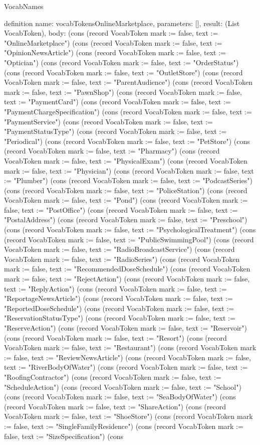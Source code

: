 \begin{lexlean}{VocabNames}
\begin{semanticmodule}
definition{
  name: vocabTokensOnlineMarketplace,
  parameters: [],
  result: (List VocabToken),
  body: (cons (record VocabToken {mark := false, text := "OnlineMarketplace"}) (cons (record VocabToken {mark := false, text := "OpinionNewsArticle"}) (cons (record VocabToken {mark := false, text := "Optician"}) (cons (record VocabToken {mark := false, text := "OrderStatus"}) (cons (record VocabToken {mark := false, text := "OutletStore"}) (cons (record VocabToken {mark := false, text := "ParentAudience"}) (cons (record VocabToken {mark := false, text := "PawnShop"}) (cons (record VocabToken {mark := false, text := "PaymentCard"}) (cons (record VocabToken {mark := false, text := "PaymentChargeSpecification"}) (cons (record VocabToken {mark := false, text := "PaymentService"}) (cons (record VocabToken {mark := false, text := "PaymentStatusType"}) (cons (record VocabToken {mark := false, text := "Periodical"}) (cons (record VocabToken {mark := false, text := "PetStore"}) (cons (record VocabToken {mark := false, text := "Pharmacy"}) (cons (record VocabToken {mark := false, text := "PhysicalExam"}) (cons (record VocabToken {mark := false, text := "Physician"}) (cons (record VocabToken {mark := false, text := "Plumber"}) (cons (record VocabToken {mark := false, text := "PodcastSeries"}) (cons (record VocabToken {mark := false, text := "PoliceStation"}) (cons (record VocabToken {mark := false, text := "Pond"}) (cons (record VocabToken {mark := false, text := "PostOffice"}) (cons (record VocabToken {mark := false, text := "PostalAddress"}) (cons (record VocabToken {mark := false, text := "Preschool"}) (cons (record VocabToken {mark := false, text := "PsychologicalTreatment"}) (cons (record VocabToken {mark := false, text := "PublicSwimmingPool"}) (cons (record VocabToken {mark := false, text := "RadioBroadcastService"}) (cons (record VocabToken {mark := false, text := "RadioSeries"}) (cons (record VocabToken {mark := false, text := "RecommendedDoseSchedule"}) (cons (record VocabToken {mark := false, text := "RejectAction"}) (cons (record VocabToken {mark := false, text := "ReplyAction"}) (cons (record VocabToken {mark := false, text := "ReportageNewsArticle"}) (cons (record VocabToken {mark := false, text := "ReportedDoseSchedule"}) (cons (record VocabToken {mark := false, text := "ReservationStatusType"}) (cons (record VocabToken {mark := false, text := "ReserveAction"}) (cons (record VocabToken {mark := false, text := "Reservoir"}) (cons (record VocabToken {mark := false, text := "Resort"}) (cons (record VocabToken {mark := false, text := "Restaurant"}) (cons (record VocabToken {mark := false, text := "ReviewNewsArticle"}) (cons (record VocabToken {mark := false, text := "RiverBodyOfWater"}) (cons (record VocabToken {mark := false, text := "RoofingContractor"}) (cons (record VocabToken {mark := false, text := "ScheduleAction"}) (cons (record VocabToken {mark := false, text := "School"}) (cons (record VocabToken {mark := false, text := "SeaBodyOfWater"}) (cons (record VocabToken {mark := false, text := "ShareAction"}) (cons (record VocabToken {mark := false, text := "ShoeStore"}) (cons (record VocabToken {mark := false, text := "SingleFamilyResidence"}) (cons (record VocabToken {mark := false, text := "SizeSpecification"}) (cons }
\end{semanticmodule}
\end{lexlean}
